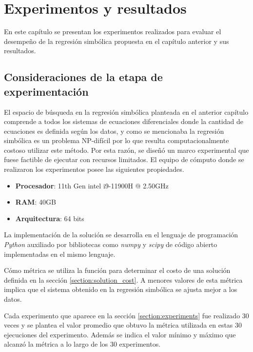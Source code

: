 \chapter{Experimentos y resultados}\label{chapter:results}

En este capítulo se presentan los experimentos realizados para evaluar el desempeño de la regresión simbólica propuesta en el capítulo anterior y sus resultados.

\section{Consideraciones de la etapa de experimentación}\label{section:experimental_considerations}

El espacio de búsqueda en la regresión simbólica planteada en el anterior capítulo comprende a todos los sistemas de ecuaciones diferenciales donde la cantidad de ecuaciones es definida según los datos, y como se mencionaba la regresión simbólica es un problema NP-difícil por lo que resulta computacionalmente costoso utilizar este método. Por esta razón, se diseñó un marco experimental que fuese factible de ejecutar con recursos limitados. El equipo de cómputo donde se realizaron los experimentos posee las siguientes propiedades.


\begin{itemize}
    \item \textbf{Procesador}: 11th Gen intel i9-11900H @ 2.50GHz
    \item \textbf{RAM}: 40GB
    \item \textbf{Arquitectura}: 64 bits
\end{itemize}

La implementación de la solución se desarrolla en el lenguaje de programación \emph{Python} auxiliado por bibliotecas como \emph{numpy} y \emph{scipy} de código abierto implementadas en el mismo lenguaje.

Cómo métrica se utiliza la función para determinar el costo de una solución definida en la sección \ref{section:solution_cost}. A menores valores de esta métrica implica que el sistema obtenido en la regresión simbólica se ajusta mejor a los datos.

Cada experimento que aparece en la sección \ref{section:experiments} fue realizado 30 veces y se plantea el valor promedio que obtuvo la métrica utilizada en estas 30 ejecuciones del experimento. Además se indica el valor mínimo y máximo que alcanzó la métrica a lo largo de los 30 experimentos.


